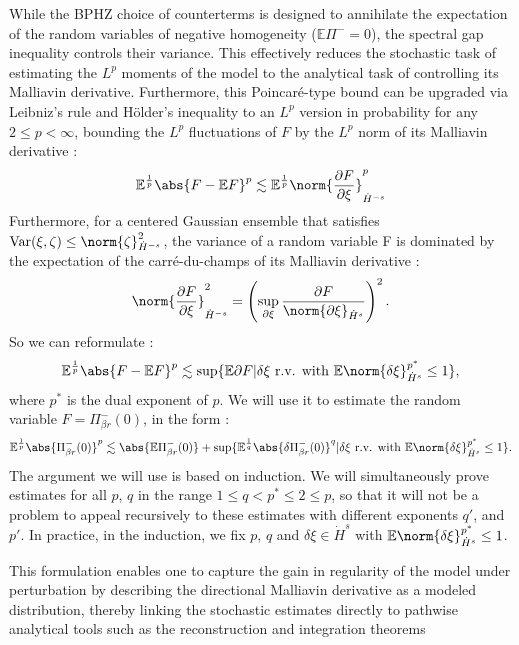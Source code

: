 While the BPHZ choice of counterterms is designed to annihilate the expectation of the random variables of negative homogeneity ($\mathbb{E}\Pi^- = 0$), the spectral gap inequality controls their variance. This effectively reduces the stochastic task of estimating the $L^p$ moments of the model to the analytical task of controlling its Malliavin derivative.
Furthermore, this Poincaré-type bound can be upgraded via Leibniz’s rule and Hölder’s inequality to an $L^p$ version in probability for any $2 \le p < \infty$, bounding the $L^p$ fluctuations of $F$ by the $L^p$ norm of its Malliavin derivative :
\begin{equation*}
    \mathbb{E}^{\frac{1}{p}}\abs{F - \mathbb{E}F}^p \lesssim \mathbb{E}^{\frac{1}{p}}\norm{\frac{\partial F}{\partial \xi}}^{p}_{\dot{H}^{-s}}
\end{equation*}
Furthermore, for a centered Gaussian ensemble that satisfies $\operatorname{Var}(\xi, \zeta)\leq \norm{\zeta}_{\dot{H}^{-s}}^2$, the variance of a random variable F is dominated by the expectation of the carré-du-champs of its Malliavin derivative :
\begin{equation*}
    \norm{\frac{\partial F}{\partial \xi}}^{2}_{\dot{H}^{-s}} = \left(\sup_{\partial \xi} \frac{\partial F}{\norm{\partial \xi}_{\dot{H}^s}}\right)^2.
\end{equation*}
So we can reformulate :
\begin{equation*}
     \mathbb{E}^{\frac{1}{p}}\abs{F - \mathbb{E}F}^p \lesssim \sup \{\mathbb{E}\partial F \vert \delta\xi \text{ r.v. with }\mathbb{E} \norm{\delta\xi}^{p^*}_{\dot{H}^s} \leq 1 \},
\end{equation*}
where $p^*$ is the dual exponent of $p$.
We will use it to estimate the random variable $F = \Pi^-_{\beta r}(0)$, in the form :
\begin{equation*}
    \mathbb{E}^{\frac{1}{p}}\abs{\Pi^-_{\beta r}(0)}^p \lesssim \abs{\mathbb{E}\Pi^-_{\beta r}(0)} + \sup \{\mathbb{E}^{\frac{1}{q}} \abs{\delta \Pi^-_{\beta r}(0)}^q  \vert \delta\xi \text{ r.v. with }\mathbb{E} \norm{\delta\xi}^{p^*}_{\dot{H}^s} \leq 1 \}.
\end{equation*}
The argument we will use is based on induction. We will simultaneously prove estimates for all $p$, $q$ in the range $1\leq q < p^* \leq 2\leq p$, so that it will not be a problem to appeal recursively to these estimates with different exponents $q'$, and $p'$.
In practice, in the induction, we fix $p$, $q$ and $\delta \xi \in \dot{H}^s$ with $\mathbb{E} \norm{\delta\xi}^{p^*}_{\dot{H}^s} \leq 1$.

This formulation enables one to capture the gain in regularity of the model under perturbation by describing the directional Malliavin derivative as a modeled distribution, thereby linking the stochastic estimates directly to pathwise analytical tools such as the reconstruction and integration theorems